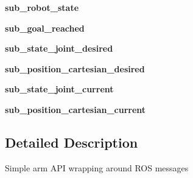 \begin{DoxyCompactItemize}
\item 
\hypertarget{classarm_1_1arm_a2619fc7825f909121b8942360d70cb64}{{\bfseries sub\-\_\-robot\-\_\-state}}\label{classarm_1_1arm_a2619fc7825f909121b8942360d70cb64}

\item 
\hypertarget{classarm_1_1arm_a94664c7134e91e050fd828a113a9b8e9}{{\bfseries sub\-\_\-goal\-\_\-reached}}\label{classarm_1_1arm_a94664c7134e91e050fd828a113a9b8e9}

\item 
\hypertarget{classarm_1_1arm_ab188b6652f6e2731a25816f8ef726084}{{\bfseries sub\-\_\-state\-\_\-joint\-\_\-desired}}\label{classarm_1_1arm_ab188b6652f6e2731a25816f8ef726084}

\item 
\hypertarget{classarm_1_1arm_a87d73921e87152a147177a3f30f35730}{{\bfseries sub\-\_\-position\-\_\-cartesian\-\_\-desired}}\label{classarm_1_1arm_a87d73921e87152a147177a3f30f35730}

\item 
\hypertarget{classarm_1_1arm_a03ffc36c0c9009cd896a6f215794021c}{{\bfseries sub\-\_\-state\-\_\-joint\-\_\-current}}\label{classarm_1_1arm_a03ffc36c0c9009cd896a6f215794021c}

\item 
\hypertarget{classarm_1_1arm_a408c9c78635fe7a98368e54ffd5fec4a}{{\bfseries sub\-\_\-position\-\_\-cartesian\-\_\-current}}\label{classarm_1_1arm_a408c9c78635fe7a98368e54ffd5fec4a}

\end{DoxyCompactItemize}


\subsection{Detailed Description}
\begin{DoxyVerb}Simple arm API wrapping around ROS messages
\end{DoxyVerb}
 

